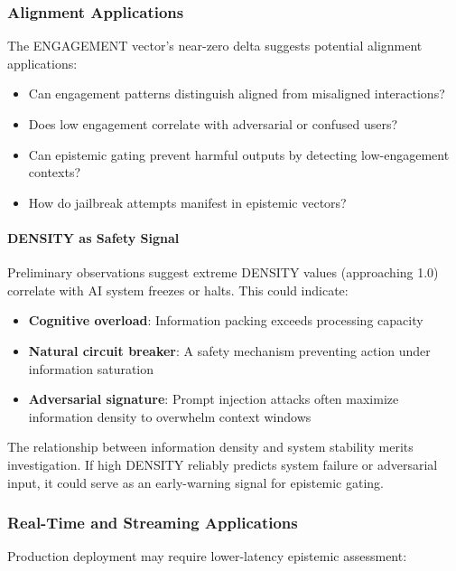 \subsubsection{Alignment Applications}

The ENGAGEMENT vector's near-zero delta suggests potential alignment applications:

\begin{itemize}
    \item Can engagement patterns distinguish aligned from misaligned interactions?
    \item Does low engagement correlate with adversarial or confused users?
    \item Can epistemic gating prevent harmful outputs by detecting low-engagement contexts?
    \item How do jailbreak attempts manifest in epistemic vectors?
\end{itemize}

\paragraph{DENSITY as Safety Signal}

Preliminary observations suggest extreme DENSITY values (approaching 1.0) correlate with AI system freezes or halts. This could indicate:

\begin{itemize}
    \item \textbf{Cognitive overload}: Information packing exceeds processing capacity
    \item \textbf{Natural circuit breaker}: A safety mechanism preventing action under information saturation
    \item \textbf{Adversarial signature}: Prompt injection attacks often maximize information density to overwhelm context windows
\end{itemize}

The relationship between information density and system stability merits investigation. If high DENSITY reliably predicts system failure or adversarial input, it could serve as an early-warning signal for epistemic gating.

\subsubsection{Real-Time and Streaming Applications}

Production deployment may require lower-latency epistemic assessment:

